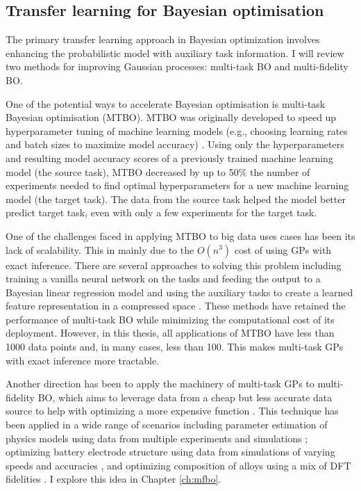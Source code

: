 \subsection{Transfer learning for Bayesian optimisation}

The primary transfer learning approach in Bayesian optimization involves enhancing the probabilistic model with auxiliary task information. I will review two methods for improving Gaussian processes: multi-task BO and multi-fidelity BO.

One of the potential ways to accelerate Bayesian optimisation is multi-task Bayesian optimisation (MTBO). MTBO was originally developed to speed up hyperparameter tuning of machine learning models (e.g., choosing learning rates and batch sizes to maximize model accuracy) \cite{Swersky2013}. Using only the hyperparameters and resulting model accuracy scores of a previously trained machine learning model (the source task),  MTBO decreased by up to 50\% the number of experiments needed to find optimal hyperparameters for a new machine learning model (the target task).  The data from the source task helped the model better predict target task, even with only a few experiments for the target task. 

One of the challenges faced in applying MTBO to big data uses cases has been its lack of scalability. This in mainly due to the $O(n^3)$ cost of using GPs with exact inference. There are several approaches to solving this problem including training a vanilla neural network on the tasks and feeding the output to a Bayesian linear regression model \cite{Perrone2018} and using the auxiliary tasks to create a learned feature representation in a compressed space \cite{Hakhamaneshi2021}. These methods have retained the performance of multi-task BO while minimizing the computational cost of its deployment. However, in this thesis, all applications of MTBO have less than 1000 data points and, in many cases, less than 100. This makes multi-task GPs with exact inference more tractable.

Another direction has been to apply the machinery of multi-task GPs to multi-fidelity BO, which aims to leverage data from a cheap but less accurate data source to help with optimizing a more expensive function \cite{Huang2006, Forrester2007}. This technique has been applied in a wide range of scenarios including parameter estimation of physics models using data from multiple experiments and simulations \cite{Perdikaris2016}; optimizing battery electrode structure using data from simulations of varying speeds and accuracies \cite{Pan2017, Folch2023}, and optimizing composition of alloys using a mix of DFT fidelities \cite{Tran2020}. I explore this idea in Chapter \ref{ch:mfbo}.

